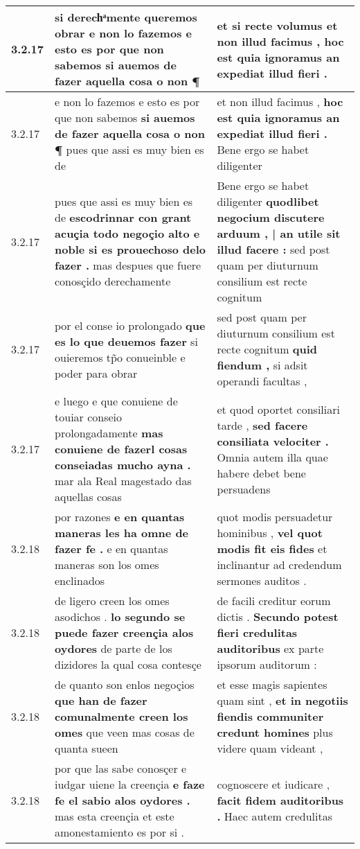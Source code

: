 \begin{tabular}{|p{1cm}|p{6.5cm}|p{6.5cm}|}
3.2.17 & si derechͣmente queremos obrar \textbf{ e non lo fazemos e esto es por que non sabemos } si auemos de fazer aquella cosa o non ¶ & et si recte volumus \textbf{ et non illud facimus , } hoc est quia ignoramus an expediat illud fieri . \\\hline
3.2.17 & e non lo fazemos e esto es por que non sabemos \textbf{ si auemos de fazer aquella cosa o non ¶ } pues que assi es muy bien es de & et non illud facimus , \textbf{ hoc est quia ignoramus an expediat illud fieri . } Bene ergo se habet diligenter \\\hline
3.2.17 & pues que assi es muy bien es de \textbf{ escodrinnar con grant acuçia todo negoçio alto e noble si es prouechoso delo fazer . } mas despues que fuere conosçido derechamente & Bene ergo se habet diligenter \textbf{ quodlibet negocium discutere arduum , | an utile sit illud facere : } sed post quam per diuturnum consilium est recte cognitum \\\hline
3.2.17 & por el conse io prolongado \textbf{ que es lo que deuemos fazer } si ouieremos tp̃o conueinble e poder para obrar & sed post quam per diuturnum consilium est recte cognitum \textbf{ quid fiendum , } si adsit operandi facultas , \\\hline
3.2.17 & e luego e que conuiene de touiar conseio prolongadamente \textbf{ mas conuiene de fazerl cosas conseiadas mucho ayna . } mar ala Real magestado das aquellas cosas & et quod oportet consiliari tarde , \textbf{ sed facere consiliata velociter . } Omnia autem illa quae habere debet bene persuadens \\\hline
3.2.18 & por razones \textbf{ e en quantas maneras les ha omne de fazer fe . } e en quantas maneras son los omes enclinados & quot modis persuadetur hominibus , \textbf{ vel quot modis fit eis fides } et inclinantur ad credendum sermones auditos . \\\hline
3.2.18 & de ligero creen los omes asodichos . \textbf{ lo segundo se puede fazer creençia alos oydores } de parte de los dizidores la qual cosa contesçe & de facili creditur eorum dictis . \textbf{ Secundo potest fieri credulitas auditoribus } ex parte ipsorum auditorum : \\\hline
3.2.18 & de quanto son enlos negoçios \textbf{ que han de fazer comunalmente creen los omes } que veen mas cosas de quanta sueen & et esse magis sapientes quam sint , \textbf{ et in negotiis fiendis communiter credunt homines } plus videre quam videant , \\\hline
3.2.18 & por que las sabe conosçer e iudgar uiene la creençia \textbf{ e faze fe el sabio alos oydores . } mas esta creençia et este amonestamiento es por si . & cognoscere et iudicare , \textbf{ facit fidem auditoribus . } Haec autem credulitas \\\hline

\end{tabular}
